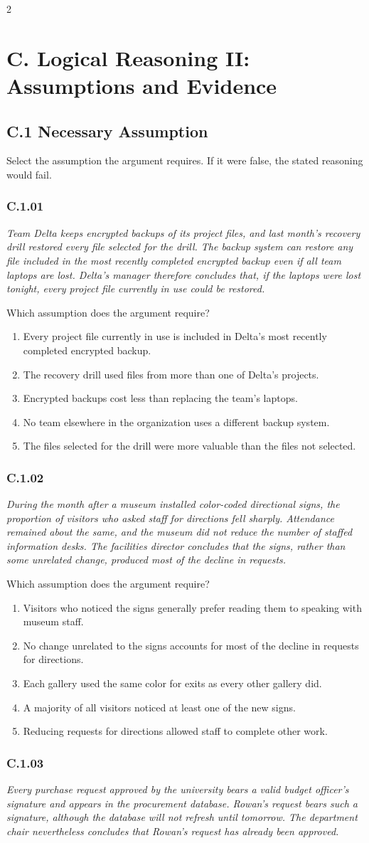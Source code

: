 \documentclass[10pt]{extarticle}
\newcommand{\choice}[1]{\item #1}
\newcommand{\bankitem}[1]{\subsubsection*{#1}}
\begin{document}
\begin{multicols}{2}
\section*{C. Logical Reasoning II: Assumptions and Evidence}
\subsection*{C.1 Necessary Assumption}
Select the assumption the argument requires. If it were false, the stated reasoning would fail.
\bankitem{C.1.01}
\emph{Team Delta keeps encrypted backups of its project files, and last month's recovery drill restored every file selected for the drill. The backup system can restore any file included in the most recently completed encrypted backup even if all team laptops are lost. Delta's manager therefore concludes that, if the laptops were lost tonight, every project file currently in use could be restored.}

Which assumption does the argument require?
\begin{enumerate}[label=(\alph*)]
  \choice{Every project file currently in use is included in Delta's most recently completed encrypted backup.}
  \choice{The recovery drill used files from more than one of Delta's projects.}
  \choice{Encrypted backups cost less than replacing the team's laptops.}
  \choice{No team elsewhere in the organization uses a different backup system.}
  \choice{The files selected for the drill were more valuable than the files not selected.}
\end{enumerate}
\bankitem{C.1.02}
\emph{During the month after a museum installed color-coded directional signs, the proportion of visitors who asked staff for directions fell sharply. Attendance remained about the same, and the museum did not reduce the number of staffed information desks. The facilities director concludes that the signs, rather than some unrelated change, produced most of the decline in requests.}

Which assumption does the argument require?
\begin{enumerate}[label=(\alph*)]
  \choice{Visitors who noticed the signs generally prefer reading them to speaking with museum staff.}
  \choice{No change unrelated to the signs accounts for most of the decline in requests for directions.}
  \choice{Each gallery used the same color for exits as every other gallery did.}
  \choice{A majority of all visitors noticed at least one of the new signs.}
  \choice{Reducing requests for directions allowed staff to complete other work.}
\end{enumerate}
\bankitem{C.1.03}
\emph{Every purchase request approved by the university bears a valid budget officer's signature and appears in the procurement database. Rowan's request bears such a signature, although the database will not refresh until tomorrow. The department chair nevertheless concludes that Rowan's request has already been approved.}


\end{multicols}
\end{document}
